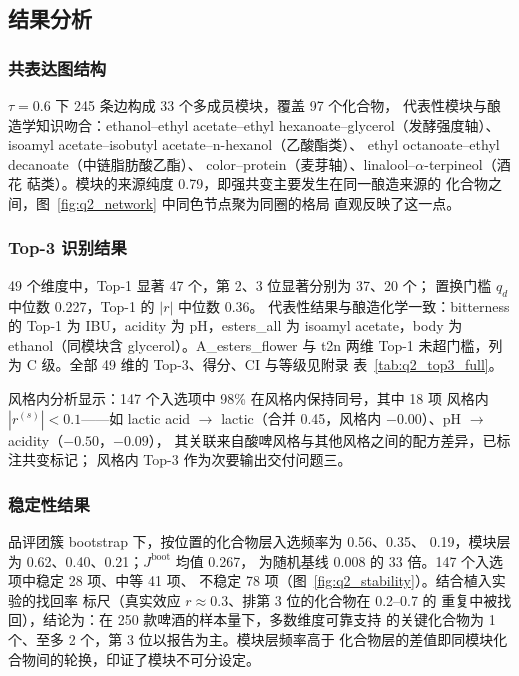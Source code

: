 \documentclass[12pt,a4paper]{article}
\begin{document}
\subsection{结果分析}

\subsubsection{共表达图结构}

$\tau=0.6$ 下 245 条边构成 33 个多成员模块，覆盖 97 个化合物，
代表性模块与酿造学知识吻合：ethanol--ethyl acetate--ethyl hexanoate--glycerol（发酵强度轴）、
isoamyl acetate--isobutyl acetate--n-hexanol（乙酸酯类）、
ethyl octanoate--ethyl decanoate（中链脂肪酸乙酯）、
color--protein（麦芽轴）、linalool--$\alpha$-terpineol（酒花
萜类）。模块的来源纯度 0.79，即强共变主要发生在同一酿造来源的
化合物之间，图~\ref{fig:q2_network} 中同色节点聚为同圈的格局
直观反映了这一点。


\subsubsection{Top-3 识别结果}

49 个维度中，Top-1 显著 47 个，第 2、3 位显著分别为 37、20 个；
置换门槛 $q_d$ 中位数 0.227，Top-1 的 $|r|$ 中位数 0.36。
代表性结果与酿造化学一致：bitterness 的 Top-1 为 IBU，acidity 为
pH，esters\_all 为 isoamyl acetate，body 为 ethanol（同模块含
glycerol）。A\_esters\_flower 与 t2n 两维 Top-1 未超门槛，列为
C 级。全部 49 维的 Top-3、得分、CI 与等级见附录
表~\ref{tab:q2_top3_full}。

风格内分析显示：147 个入选项中 98\% 在风格内保持同号，其中 18 项
风格内 $|r^{(s)}|<0.1$——如 lactic acid $\to$ lactic（合并
0.45，风格内 $-0.00$）、pH $\to$ acidity（$-0.50$，$-0.09$），
其关联来自酸啤风格与其他风格之间的配方差异，已标注共变标记；
风格内 Top-3 作为次要输出交付问题三。

\subsubsection{稳定性结果}

品评团簇 bootstrap 下，按位置的化合物层入选频率为 0.56、0.35、
0.19，模块层为 0.62、0.40、0.21；$J^{\mathrm{boot}}$ 均值 0.267，
为随机基线 0.008 的 33 倍。147 个入选项中稳定 28 项、中等 41 项、
不稳定 78 项（图~\ref{fig:q2_stability}）。结合植入实验的找回率
标尺（真实效应 $r\approx0.3$、排第 3 位的化合物在 0.2--0.7 的
重复中被找回），结论为：在 250 款啤酒的样本量下，多数维度可靠支持
的关键化合物为 1 个、至多 2 个，第 3 位以报告为主。模块层频率高于
化合物层的差值即同模块化合物间的轮换，印证了模块不可分设定。
\end{document}
